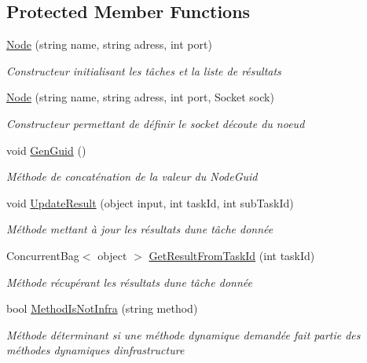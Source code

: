 \subsection*{Protected Member Functions}
\begin{DoxyCompactItemize}
\item 
\hyperlink{class_node_net_1_1_network_1_1_nodes_1_1_node_a45631b11e4cc24c9467c966d317ae44a}{Node} (string name, string adress, int port)
\begin{DoxyCompactList}\small\item\em Constructeur initialisant les tâches et la liste de résultats \end{DoxyCompactList}\item 
\hyperlink{class_node_net_1_1_network_1_1_nodes_1_1_node_a67231be4d4cd246c9034ebb4d9085d18}{Node} (string name, string adress, int port, Socket sock)
\begin{DoxyCompactList}\small\item\em Constructeur permettant de définir le socket d\textquotesingle{}écoute du noeud \end{DoxyCompactList}\item 
void \hyperlink{class_node_net_1_1_network_1_1_nodes_1_1_node_aefc346ee9ebf697f8f7c346deee276d7}{Gen\+Guid} ()
\begin{DoxyCompactList}\small\item\em Méthode de concaténation de la valeur du Node\+Guid \end{DoxyCompactList}\item 
void \hyperlink{class_node_net_1_1_network_1_1_nodes_1_1_node_ada06ebbb68d6c3661903f154d4c09949}{Update\+Result} (object input, int task\+Id, int sub\+Task\+Id)
\begin{DoxyCompactList}\small\item\em Méthode mettant à jour les résultats d\textquotesingle{}une tâche donnée \end{DoxyCompactList}\item 
Concurrent\+Bag$<$ object $>$ \hyperlink{class_node_net_1_1_network_1_1_nodes_1_1_node_afce378baeedbf4875673f4f3e124eb91}{Get\+Result\+From\+Task\+Id} (int task\+Id)
\begin{DoxyCompactList}\small\item\em Méthode récupérant les résultats d\textquotesingle{}une tâche donnée \end{DoxyCompactList}\item 
bool \hyperlink{class_node_net_1_1_network_1_1_nodes_1_1_node_a63e45bca1811b06988d6158965205daf}{Method\+Is\+Not\+Infra} (string method)
\begin{DoxyCompactList}\small\item\em Méthode déterminant si une méthode dynamique demandée fait partie des méthodes dynamiques d\textquotesingle{}infrastructure \end{DoxyCompactList}\end{DoxyCompactItemize}
